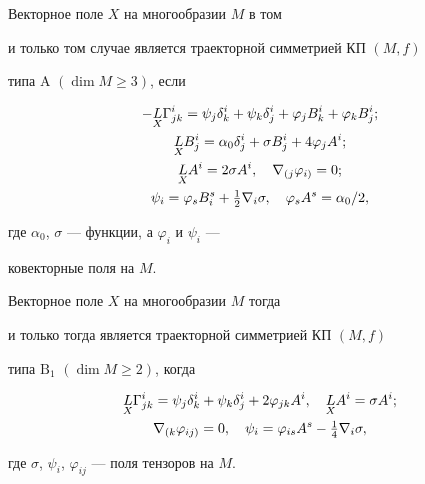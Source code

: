 \begin{thm} 


Векторное поле $X$ на многообразии $M$ в том 


и только том случае является траекторной симметрией КП $(M,f)$ 


типа $\mathrm A$ $(\dim M\ge3)$, если 


\begin{gather*} 


-\down{X}{L}\Gamma^i_{j k}=\psi_j\delta^i_k+\psi_k\delta^i_j+ 


\varphi_j B^i_k+\varphi_k B^i_j;\\ 


% 


\down{X}{L}B^i_j=\alpha_0\delta^i_j+\sigma B^i_j+ 


4\varphi_j A^i;\\ 


% 


\down{X}{L}A^i=2\sigma A^i,\quad \nabla_{(j}\varphi_{i)}=0;\\ 


% 


\psi_i=\varphi_s B^s_i+\tfrac{1}{2}\nabla_i\sigma,\quad 


\varphi_s A^s=\alpha_0/2, 


\end{gather*} 


где $\alpha_0$, $\sigma$ --- функции, а $\varphi_i$ и $\psi_i$ --- 


ковекторные поля на $M$. 


\end{thm} 


 


\begin{thm} 


Векторное поле $X$ на многообразии $M$ тогда 


и только тогда является траекторной симметрией КП $(M,f)$ 


типа $\mathrm B_1$ $(\dim M\ge2)$, когда 


\begin{gather*} 


\down{X}{L}\Gamma^i_{j k}=\psi_j\delta^i_k+\psi_k\delta^i_j+ 


2\varphi_{j k}A^i,\quad 


\down{X}{L}A^i=\sigma A^i;\\ 


% 


\nabla_{(k}\varphi_{i j)}=0,\quad \psi_i=\varphi_{is} 


A^s-\tfrac{1}{4}\nabla_i\sigma, 


\end{gather*} 


где $\sigma$, $\psi_i$, $\varphi_{i j}$ --- поля тензоров на $M$. 


\end{thm} 


